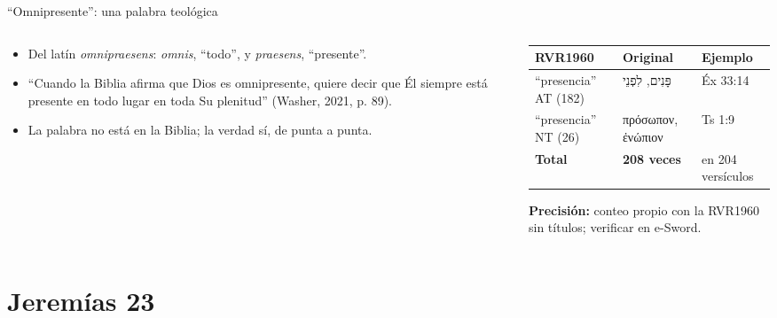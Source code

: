 \documentclass[hyperref={bookmarks=false},aspectratio=169]{beamer}
\newcommand{\heb}[1]{\mbox{\foreignlanguage{hebrew}{#1}}}
\newcommand{\grc}[1]{\foreignlanguage{ancientgreek}{#1}}
\newcommand{\precision}[1]{{\footnotesize\color{gris}\textbf{Precisión:} #1}}
\begin{document}
\begin{frame}{``Omnipresente'': una palabra teológica}
\begin{columns}[c,onlytextwidth]
\begin{column}{0.46\textwidth}\small
\begin{itemize}
\item Del latín \emph{omnipraesens}: \emph{omnis}, ``todo'', y \emph{praesens}, ``presente''.
\item ``Cuando la Biblia afirma que Dios es omnipresente, quiere decir que Él siempre está presente en todo lugar en toda Su plenitud'' (Washer, 2021, p. 89).
\item La palabra no está en la Biblia; la verdad sí, de punta a punta.
\end{itemize}
\end{column}
\begin{column}{0.52\textwidth}
\scriptsize\renewcommand{\arraystretch}{1.15}
\begin{tabular}{@{}>{\RaggedRight\arraybackslash}p{1.7cm}>{\RaggedRight\arraybackslash}p{2.0cm}>{\RaggedRight\arraybackslash}p{2.4cm}@{}}
\toprule
\textbf{RVR1960} & \textbf{Original} & \textbf{Ejemplo} \\ \midrule
``presencia'' AT (182) & \heb{פָּנִים}, \heb{לִפְנֵי} & Éx 33:14 \\
``presencia'' NT (26) & \grc{πρόσωπον}, \grc{ἐνώπιον} & 2 Ts 1:9 \\ \midrule
\textbf{Total} & \textbf{208 veces} & en 204 versículos \\
\bottomrule
\end{tabular}\par\smallskip
\precision{conteo propio con la RVR1960 sin títulos; verificar en e-Sword.}
\end{column}
\end{columns}
\end{frame}

\section{Jeremías 23}
\end{document}
